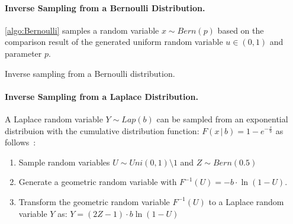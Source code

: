 \paragraph{Inverse Sampling from a Bernoulli Distribution.}
\label{SamplingfromaBernoulliDistribution}
\autoref{algo:Bernoulli} samples a random variable $x\sim Bern\left(p\right) $ based on the comparison result of the generated uniform random variable $u \in \left(0,1\right) $ and parameter $p$.

\begin{algorithm}[tbh!]
    \centering
    \caption{Inverse sampling from a Bernoulli distribution.}
    \label{algo:Bernoulli}
\end{algorithm}
\FloatBarrier

\paragraph{Inverse Sampling from a Laplace Distribution.}
\label{algo:InverseTransform-BasedLaplaceSamplingMethod}
A Laplace random variable $Y\sim Lap\left(b\right) $ can be sampled from an exponential distribuion with the cumulative distribution function: $F\left(x\,|\, b\right) =1-e^{-\frac{x}{b}}$ as follows~\cite{mironov2012significance}:
\begin{enumerate}
    \item Sample random variables $U\sim Uni\left(0,1\right)\setminus 1 $ and $Z \sim Bern\left(0.5\right) $
    \item Generate a geometric random variable with $  F^{-1}\left(U\right) =-b \cdot \ln\left(1-U\right)  $.
    \item Transform the geometric random variable $F^{-1}\left(U\right)$ to a Laplace random variable $Y$ as: $Y= \left(2Z-1\right)\cdot b \ln\left(1-U\right) $
\end{enumerate}



